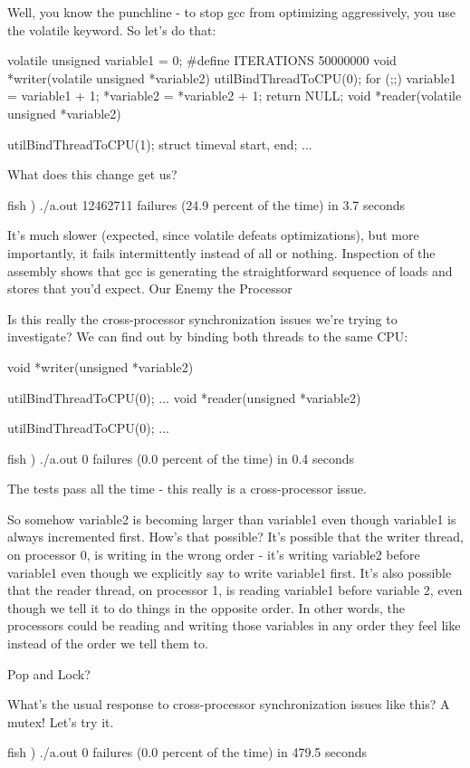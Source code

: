 {Well, you know the punchline - to stop gcc from optimizing aggressively, you use the volatile keyword. So let's do that:

volatile unsigned variable1 = 0;
#define ITERATIONS 50000000
void *writer(volatile unsigned *variable2) {
        utilBindThreadToCPU(0);
        for (;;) {
                variable1 = variable1 + 1;
                *variable2 = *variable2 + 1;
        }
        return NULL;
}
void *reader(volatile unsigned *variable2) {
        utilBindThreadToCPU(1);
        struct timeval start, end;
        ...

What does this change get us?

fish ) ./a.out
12462711 failures (24.9 percent of the time) in 3.7 seconds

It's much slower (expected, since volatile defeats optimizations), but more importantly, it fails intermittently instead of all or nothing. Inspection of the assembly shows that gcc is generating the straightforward sequence of loads and stores that you'd expect.
Our Enemy the Processor

Is this really the cross-processor synchronization issues we're trying to investigate? We can find out by binding both threads to the same CPU:

void *writer(unsigned *variable2) {
        utilBindThreadToCPU(0);
        ...
void *reader(unsigned *variable2) {
        utilBindThreadToCPU(0);
        ...

fish ) ./a.out
0 failures (0.0 percent of the time) in 0.4 seconds

The tests pass all the time - this really is a cross-processor issue.

So somehow variable2 is becoming larger than variable1 even though variable1 is always incremented first. How's that possible? It's possible that the writer thread, on processor 0, is writing in the wrong order - it's writing variable2 before variable1 even though we explicitly say to write variable1 first. It's also possible that the reader thread, on processor 1, is reading variable1 before variable 2, even though we tell it to do things in the opposite order. In other words, the processors could be reading and writing those variables in any order they feel like instead of the order we tell them to. 

Pop and Lock?

What's the usual response to cross-processor synchronization issues like this? A mutex! Let's try it.

fish ) ./a.out
0 failures (0.0 percent of the time) in 479.5 seconds

}}}}
